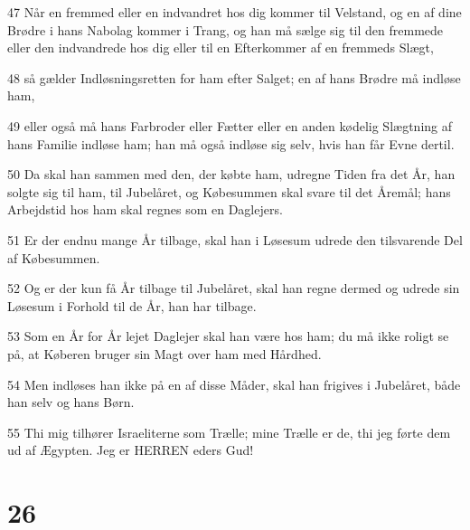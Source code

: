\par 47 Når en fremmed eller en indvandret hos dig kommer til Velstand, og en af dine Brødre i hans Nabolag kommer i Trang, og han må sælge sig til den fremmede eller den indvandrede hos dig eller til en Efterkommer af en fremmeds Slægt,
\par 48 så gælder Indløsningsretten for ham efter Salget; en af hans Brødre må indløse ham,
\par 49 eller også må hans Farbroder eller Fætter eller en anden kødelig Slægtning af hans Familie indløse ham; han må også indløse sig selv, hvis han får Evne dertil.
\par 50 Da skal han sammen med den, der købte ham, udregne Tiden fra det År, han solgte sig til ham, til Jubelåret, og Købesummen skal svare til det Åremål; hans Arbejdstid hos ham skal regnes som en Daglejers.
\par 51 Er der endnu mange År tilbage, skal han i Løsesum udrede den tilsvarende Del af Købesummen.
\par 52 Og er der kun få År tilbage til Jubelåret, skal han regne dermed og udrede sin Løsesum i Forhold til de År, han har tilbage.
\par 53 Som en År for År lejet Daglejer skal han være hos ham; du må ikke roligt se på, at Køberen bruger sin Magt over ham med Hårdhed.
\par 54 Men indløses han ikke på en af disse Måder, skal han frigives i Jubelåret, både han selv og hans Børn.
\par 55 Thi mig tilhører Israeliterne som Trælle; mine Trælle er de, thi jeg førte dem ud af Ægypten. Jeg er HERREN eders Gud!

\chapter{26}

